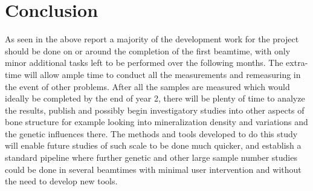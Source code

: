 \documentclass[a4paper,10pt]{article}
\begin{document}
\section{Conclusion}
As seen in the above report a majority of the development work for the project should be done on or around the completion of the first beamtime, with only minor additional tasks left to be performed over the following months. The extra-time will allow ample time to conduct all the measurements and remeasuring in the event of other problems. After all the samples are measured which would ideally be completed by the end of year 2, there will be plenty of time to analyze the results, publish and possibly begin investigatory studies into other aspects of bone structure for example looking into mineralization density and variations and the genetic influences there. The methods and tools developed to do this study will enable future studies of such scale to be done much quicker, and establish a standard pipeline where further genetic and other large sample number studies could be done in several beamtimes with minimal user intervention and without the need to develop new tools.
\end{document}
